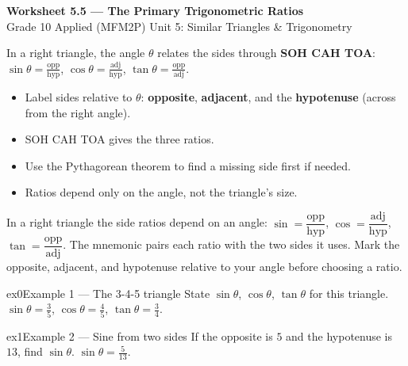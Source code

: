 \documentclass[11pt]{article}
\begin{document}
\begin{center}
{\LARGE\bfseries\color{titleblue}Worksheet 5.5 --- The Primary Trigonometric Ratios}\\[2pt]
{\small Grade 10 Applied (MFM2P) \textperiodcentered{} Unit 5: Similar Triangles \& Trigonometry}
\end{center}

\begin{ideabox}
In a right triangle, the angle $\theta$ relates the sides through \textbf{SOH CAH TOA}: $\sin\theta=\tfrac{\text{opp}}{\text{hyp}}$, $\cos\theta=\tfrac{\text{adj}}{\text{hyp}}$, $\tan\theta=\tfrac{\text{opp}}{\text{adj}}$.
\begin{itemize}[leftmargin=*,itemsep=2pt]
  \item Label sides relative to $\theta$: \textbf{opposite}, \textbf{adjacent}, and the \textbf{hypotenuse} (across from the right angle).
  \item SOH CAH TOA gives the three ratios.
  \item Use the Pythagorean theorem to find a missing side first if needed.
  \item Ratios depend only on the angle, not the triangle's size.
\end{itemize}
\end{ideabox}

\begin{learnbox}
In a right triangle the side ratios depend on an angle: $\sin=\dfrac{\text{opp}}{\text{hyp}}$, $\cos=\dfrac{\text{adj}}{\text{hyp}}$, $\tan=\dfrac{\text{opp}}{\text{adj}}$.
The mnemonic pairs each ratio with the two sides it uses.
Mark the opposite, adjacent, and hypotenuse relative to your angle before choosing a ratio.
\end{learnbox}


\begin{example}{ex0}{Example 1 --- The 3-4-5 triangle}
State $\sin\theta$, $\cos\theta$, $\tan\theta$ for this triangle.
\soln $\sin\theta=\tfrac35$, $\cos\theta=\tfrac45$, $\tan\theta=\tfrac34.$
\end{example}

\begin{example}{ex1}{Example 2 --- Sine from two sides}
If the opposite is $5$ and the hypotenuse is $13$, find $\sin\theta$.
\soln $\sin\theta=\tfrac{5}{13}.$
\end{example}
\end{document}
